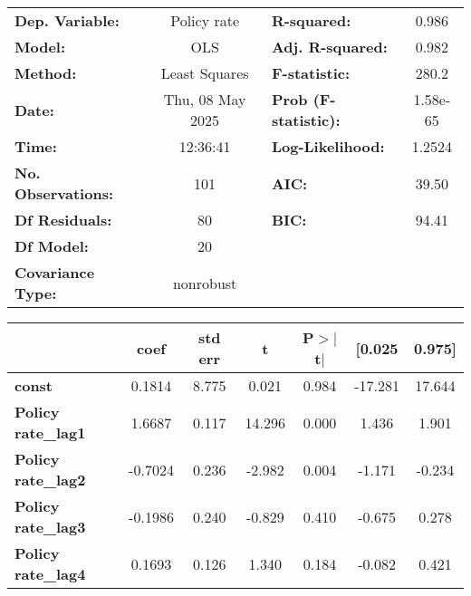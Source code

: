 \begin{center}
\begin{tabular}{lclc}
\toprule
\textbf{Dep. Variable:}         &   Policy rate    & \textbf{  R-squared:         } &     0.986   \\
\textbf{Model:}                 &       OLS        & \textbf{  Adj. R-squared:    } &     0.982   \\
\textbf{Method:}                &  Least Squares   & \textbf{  F-statistic:       } &     280.2   \\
\textbf{Date:}                  & Thu, 08 May 2025 & \textbf{  Prob (F-statistic):} &  1.58e-65   \\
\textbf{Time:}                  &     12:36:41     & \textbf{  Log-Likelihood:    } &    1.2524   \\
\textbf{No. Observations:}      &         101      & \textbf{  AIC:               } &     39.50   \\
\textbf{Df Residuals:}          &          80      & \textbf{  BIC:               } &     94.41   \\
\textbf{Df Model:}              &          20      & \textbf{                     } &             \\
\textbf{Covariance Type:}       &    nonrobust     & \textbf{                     } &             \\
\bottomrule
\end{tabular}
\begin{tabular}{lcccccc}
                                & \textbf{coef} & \textbf{std err} & \textbf{t} & \textbf{P$> |$t$|$} & \textbf{[0.025} & \textbf{0.975]}  \\
\midrule
\textbf{const}                  &       0.1814  &        8.775     &     0.021  &         0.984        &      -17.281    &       17.644     \\
\textbf{Policy rate\_lag1}      &       1.6687  &        0.117     &    14.296  &         0.000        &        1.436    &        1.901     \\
\textbf{Policy rate\_lag2}      &      -0.7024  &        0.236     &    -2.982  &         0.004        &       -1.171    &       -0.234     \\
\textbf{Policy rate\_lag3}      &      -0.1986  &        0.240     &    -0.829  &         0.410        &       -0.675    &        0.278     \\
\textbf{Policy rate\_lag4}      &       0.1693  &        0.126     &     1.340  &         0.184        &       -0.082    &        0.421     \\

\end{tabular}
\end{center}
